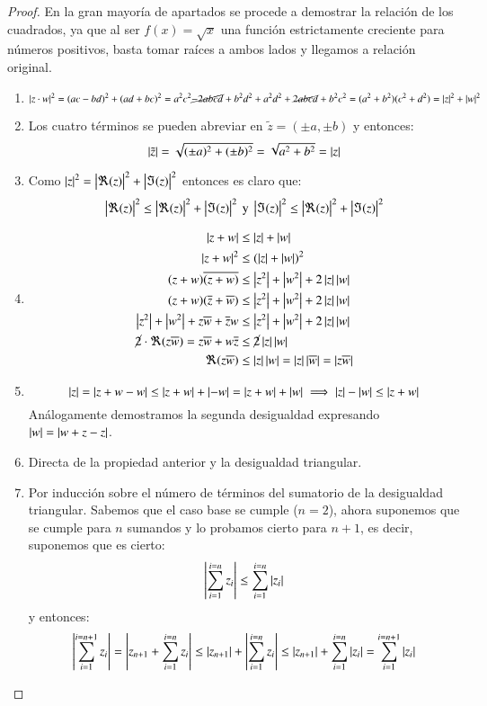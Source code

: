     \begin{proof} En la gran mayoría de apartados se procede a demostrar la relación de los cuadrados, ya que al ser $f(x) = \sqrt{x}$ una función estrictamente creciente para números positivos, basta tomar raíces a ambos lados y llegamos a relación original.
        \begin{enumerate}
            \item $$\left|z \cdot w\right|^2 = (ac-bd)^2+(ad+bc)^2 = a^2c^2 \cancel{-2abcd} + b^2d^2 + a^2d^2 +\cancel{2abcd} + b^2c^2 = (a^2+b^2)(c^2+d^2) = \left|z\right|^2 + \left|w\right|^2$$
            \item Los cuatro términos se pueden abreviar en $\tilde z = (\pm a, \pm b)$ y entonces: $$\left|\tilde z\right| = \sqrt{(\pm a)^2 + (\pm b)^2} = \sqrt{a^2 + b^2} = \left|z\right|$$
            \item Como $\left|z\right|^2 = \left|\Re(z)\right|^2 + \left|\Im(z)\right|^2$ entonces es claro que:
            $$
                \left|\Re(z)\right|^2 \leq \left|\Re(z)\right|^2 + \left|\Im(z)\right|^2 \text{ y } \left|\Im(z)\right|^2 \leq \left|\Re(z)\right|^2 + \left|\Im(z)\right|^2
            $$
            \item
            \begin{align*}
                \left|z + w\right| &\leq \left|z\right| + \left|w\right|\\
                \left|z + w\right|^2 &\leq (\left|z\right| + \left|w\right|)^2\\
                (z+w)\overline{(z+w)} &\leq \left|z^2\right| + \left|w^2\right| + 2\left|z\right|\left|w\right|\\
                (z+w)(\overline{z} + \overline{w}) &\leq \left|z^2\right| + \left|w^2\right| + 2\left|z\right|\left|w\right|\\
                \left|z^2\right| + \left|w^2\right| + z\overline{w} + \overline{z} w &\leq \left|z^2\right| + \left|w^2\right| + 2\left|z\right|\left|w\right|\\
                \cancel 2\cdot\Re(z\overline{w}) = z \overline{w} + w \overline{z} &\leq \cancel 2 \left|z\right| \left|w\right|\\
                \Re(z\overline{w}) &\leq \left|z\right|\left|w\right| = \left|z\right|\left|\overline{w}\right| = \left|z\overline{w}\right|
            \end{align*}
            \item
            $$
                \left|z\right| = \left|z + w - w\right| \leq \left|z + w\right| + \left|-w\right| = \left|z + w\right| + \left|w\right| \implies \left|z\right| - \left|w\right| \leq \left|z + w\right|
            $$
            Análogamente demostramos la segunda desigualdad expresando $\left|w\right| = \left|w + z - z\right|$.
            \item Directa de la propiedad anterior y la desigualdad triangular.
            \item Por inducción sobre el número de términos del sumatorio de la desigualdad triangular. Sabemos que el caso base se cumple ($n=2$), ahora suponemos que se cumple para $n$ sumandos y lo probamos cierto para $n+1$, es decir, suponemos que es cierto:
            $$
                \left|\sum_{i=1}^{i=n} z_i\right| \leq \sum_{i=1}^{i=n} \left|z_i\right|
            $$ y entonces:
            $$
                \left|\sum_{i=1}^{i=n+1} z_i\right| = \left|z_{n+1} + \sum_{i=1}^{i=n} z_i\right| \leq \left|z_{n+1}\right| + \left|\sum_{i=1}^{i=n} z_i\right| \leq \left|z_{n+1}\right| + \sum_{i=1}^{i=n} \left|z_i\right| = \sum_{i=1}^{i=n+1} \left|z_i\right|
            $$
        \end{enumerate}
    \end{proof}
